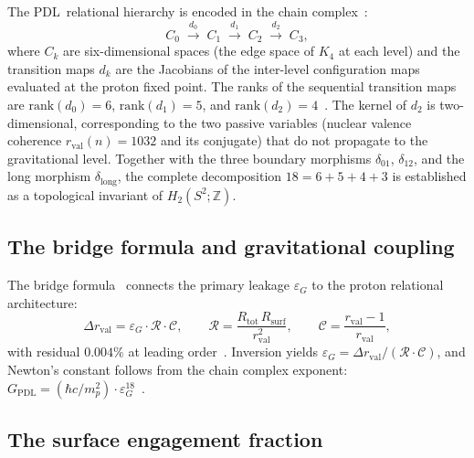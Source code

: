 \documentclass[11pt,a4paper]{article}
\theoremstyle{definition}
\newcommand{\PDL}{\textnormal{PDL}}
\newcommand{\Rsurf}{R_{\mathrm{surf}}}
\newcommand{\Rtot}{R_{\mathrm{tot}}}
\newcommand{\rval}{r_{\mathrm{val}}}
\newcommand{\epsg}{\varepsilon_G}
\newcommand{\Kfour}{K_4}
\newcommand{\calC}{\mathcal{C}}
\newcommand{\calR}{\mathcal{R}}
\newcommand{\GPDL}{G_{\mathrm{PDL}}}
\newcommand{\drval}{\Delta r_{\mathrm{val}}}
\begin{document}
The \PDL\ relational hierarchy is encoded in the chain complex~\cite{Topology_18_PDL_2026}:
\begin{equation}
C_0 \;\xrightarrow{d_0}\; C_1 \;\xrightarrow{d_1}\; C_2 \;\xrightarrow{d_2}\; C_3,
\label{eq:chain}
\end{equation}
where $C_k$ are six-dimensional spaces (the edge space of $\Kfour$ at each level) and the transition maps $d_k$ are the Jacobians of the inter-level configuration maps evaluated at the proton fixed point. The ranks of the sequential transition maps are $\mathrm{rank}(d_0) = 6$, $\mathrm{rank}(d_1) = 5$, and $\mathrm{rank}(d_2) = 4$~\cite{Topology_18_PDL_2026}. The kernel of $d_2$ is two-dimensional, corresponding to the two passive variables (nuclear valence coherence $\rval(n) = 1032$ and its conjugate) that do not propagate to the gravitational level. Together with the three boundary morphisms $\delta_{01}$, $\delta_{12}$, and the long morphism $\delta_{\mathrm{long}}$, the complete decomposition $18 = 6+5+4+3$ is established as a topological invariant of $H_2(S^2;\mathbb{Z})$.

\subsection{The bridge formula and gravitational coupling}
\label{subsec:bridge}

The bridge formula~\cite{Bridge_PDL_2026} connects the primary leakage $\epsg$ to the proton relational architecture:
\begin{equation}
\drval = \epsg\cdot\calR\cdot\calC, \qquad \calR = \frac{\Rtot\,\Rsurf}{\rval^2}, \qquad \calC = \frac{\rval-1}{\rval},
\label{eq:bridge}
\end{equation}
with residual $0.004\%$ at leading order~\cite{Bridge_PDL_2026}. Inversion yields $\epsg = \drval/(\calR\cdot\calC)$, and Newton's constant follows from the chain complex exponent: $\GPDL = (\hbar c/m_p^2)\cdot\epsg^{18}$~\cite{Bridge_PDL_2026,Topology_18_PDL_2026}.

\subsection{The surface engagement fraction}
\label{subsec:sigma}
\end{document}
